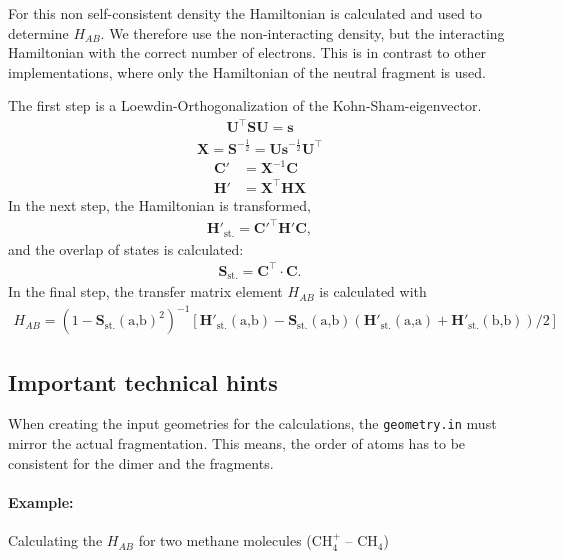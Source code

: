 For this non self-consistent density the Hamiltonian is calculated and used to determine $H_{AB}$. We therefore use the non-interacting density, but the interacting Hamiltonian with the correct number of electrons. This is in contrast to other implementations, where only the Hamiltonian of the neutral fragment is used.

The first step is a Loewdin-Orthogonalization of the Kohn-Sham-eigenvector.  
\begin{align}
\mathbf{U^\top SU} = \mathbf{s}
\end{align}
%
\begin{align}
\mathbf{X} = \mathbf{S}^{-\frac{1}{2}} = \mathbf{Us}^{-\frac{1}{2}}\mathbf{U}^\top
\end{align}
%
\begin{align}
\mathbf{C'} &= \mathbf{X}^{-1}\mathbf{C} \nonumber\\
\mathbf{H'} &= \mathbf{X^\top HX}
\end{align}
%
In the next step, the Hamiltonian is transformed,
\begin{align}
\mathbf{H'}_{\text{st.}} = \mathbf{C'^\top H'C},
\end{align}
and the overlap of states is calculated:
\begin{align}
\mathbf{S}_{\text{st.}} = \mathbf{C^\top\cdot C}.
\end{align}
%
In the final step, the transfer matrix element $H_{AB}$ is calculated with
\begin{align}\label{eq:hab_final}
H_{AB} = \left(1-\mathbf{S}{_{\text{st.}}(\text{a,b})}^2\right)^{-1}\left[{\mathbf{H'}_{\text{st.}}(\text{a,b}) - \mathbf{S}_{\text{st.}}(\text{a,b})\left(\mathbf{H'}_{\text{st.}}(\text{a,a}) + \mathbf{H'}_{\text{st.}}(\text{b,b})\right)/2}\right]
\end{align}

\subsection*{Important technical hints}
When creating the input geometries for the calculations, the \texttt{geometry.in} must mirror the actual fragmentation. This means, the order of atoms has to be consistent for the dimer and the fragments.

\paragraph{Example:} Calculating the $H_{AB}$ for two methane molecules (CH$_4^+$ -- CH$_4$)

